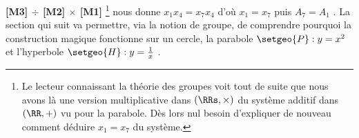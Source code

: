 \medskip

\textbf{[M3] $\div$ [M2] $\times$ [M1]}
\footnote{
	Le lecteur connaissant la théorie des groupes voit tout de suite que nous avons là une version multiplicative dans $(\RRs , \times)$ du système additif dans $(\RR , +)$ vu pour la parabole.
	Dès lors nul besoin d'expliquer de nouveau comment déduire  $x_1 = x_7$ du système.
}
nous donne $x_1 x_4 = x_7 x_4$ d'où $x_1 = x_7$ puis $A_7 = A_1$ .
La section qui suit va permettre, via la notion de groupe, de comprendre pourquoi la construction magique fonctionne sur un cercle, la parabole $\setgeo{P} : y = x^2$ et l'hyperbole $\setgeo{H} : y = \frac{1}{x}$ .
